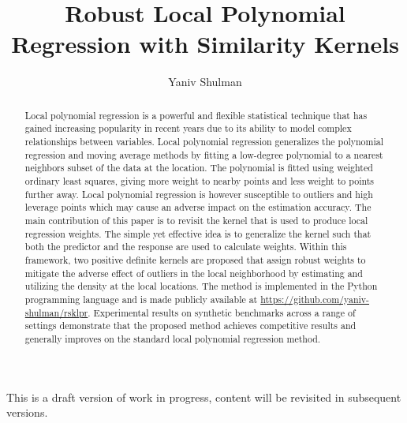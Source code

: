 \documentclass[preprint,1p,times]{elsarticle}
\begin{document}
\begin{frontmatter}

\vspace*{\fill}
\begin{center}
This is a draft version of work in progress, content will be revisited in subsequent versions.
\end{center}
\vspace*{\fill}
    
\title{Robust Local Polynomial Regression with Similarity Kernels}
\author{Yaniv Shulman}
\address{yaniv@shulman.info}


\begin{abstract}
Local polynomial regression is a powerful and flexible statistical technique that has gained increasing popularity in recent years due to its ability to model complex relationships between variables. Local polynomial regression generalizes the polynomial regression and moving average methods by fitting a low-degree polynomial to a nearest neighbors subset of the data at the location. The polynomial is fitted using weighted ordinary least squares, giving more weight to nearby points and less weight to points further away. Local polynomial regression is however susceptible to outliers and high leverage points which may cause an adverse impact on the estimation accuracy. The main contribution of this paper is to revisit the kernel that is used to produce local regression weights. The simple yet effective idea is to generalize the kernel such that both the predictor and the response are used to calculate weights. Within this framework, two positive definite kernels are proposed that assign robust weights to mitigate the adverse effect of outliers in the local neighborhood by estimating and utilizing the density at the local locations. The method is implemented in the Python programming language and is made publicly available at \url{https://github.com/yaniv-shulman/rsklpr}. Experimental results on synthetic benchmarks across a range of settings demonstrate that the proposed method achieves competitive results and generally improves on the standard local polynomial regression method.
\end{abstract}
\end{frontmatter}
\end{document}

